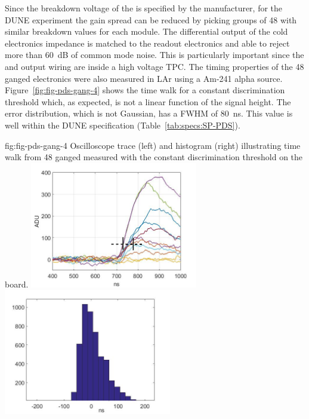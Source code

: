 Since the breakdown voltage of the  is specified by the manufacturer, for the DUNE experiment the gain spread can be reduced by picking groups of 48  with similar breakdown values for each module. The differential output of the cold electronics impedance is matched to the readout electronics and able to reject more than \SI{60}{dB} of common mode noise. This is particularly important since the  and output wiring are inside a high voltage TPC. The timing properties of the 48 ganged electronics were also measured 
in LAr using a Am-241 alpha source. 
Figure~\ref{fig:fig-pds-gang-4} shows the time walk for a constant discrimination threshold which, 
as expected, is not a linear function of the signal height. The error distribution, which is not Gaussian, has a FWHM of \SI{80}{ns}. This value is well within the DUNE specification (Table~\ref{tab:specs:SP-PDS}).

\begin{dunefigure}
 {fig:fig-pds-gang-4}
 {Oscilloscope trace (left) and histogram (right) illustrating time walk from 48 ganged  measured with the constant discrimination threshold on the  board.}
\includegraphics[height=5.5cm]{graphics/pds-gang-time-walk.jpg}
\includegraphics[height=5.5cm]{graphics/pds-gang-time-walk-hist.jpg}
\end{dunefigure}

